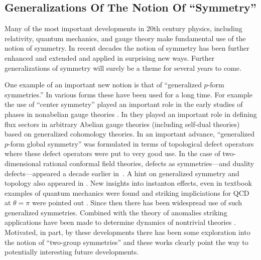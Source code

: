 \documentclass[12pt]{article}
\begin{document}
  

\subsection{Generalizations Of The Notion Of ``Symmetry'' }

Many of the most important developments in 20th century
physics, including relativity, quantum mechanics, and
gauge theory make fundamental use of the notion of symmetry.
In recent decades the notion of symmetry has been further enhanced
and extended and applied in surprising new ways. Further generalizations
of symmetry will surely be a theme for several years to come.




One example of an important new notion is that of ``generalized $p$-form symmetries.''
In various forms these have been used for a long time. For example the use of
``center symmetry'' played an important role in the early studies of phases in
nonabelian gauge theories \cite{PolyakovBook,tHooft:1979rtg}.
  In   \cite{Freed:2006yc} they played an important role in defining flux sectors
in arbitrary Abelian gauge theories (including self-dual theories)
based on generalized cohomology theories.
 In an important advance,
``generalized $p$-form global symmetry'' was formulated in terms of topological defect operators  \cite{Gaiotto:2014kfa} where 
these defect operators were put to
very good use. In the case of two-dimensional rational conformal field theories, defects as symmetries---and duality defects---appeared a decade earlier in~\cite{MR2115752}.
A hint on generalized symmetry and topology also appeared in \cite{Nussinov:2006iva,Nussinov:2009zz}. New insights into instanton effects, even in
textbook examples of quantum mechanics  were found and striking
impliciations for QCD at $\theta=\pi$ were pointed out \cite{Gaiotto:2017yup}.
Since then there has been widespread use of such generalized
symmetries. Combined with the theory of anomalies striking
applications have been made to determine dynamics of nontrivial
theories \cite{Gaiotto:2017tne,Cordova:2019uob,Cordova:2019jnf,Cordova:2019jqi,Cordova:2019bsd, Bhardwaj:2022dyt, Delmastro:2022pfo, Brennan:2022tyl}.
Motivated, in part, by these developments there has been some
exploration into the notion of ``two-group symmetries''  \cite{Cordova:2018cvg,Cordova:2020tij}
and these works clearly point the way to potentially interesting future developments.
\end{document}
